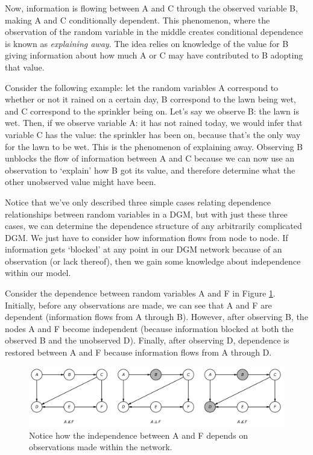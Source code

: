 Now, information is flowing between A and C through the observed variable B, making A and C conditionally dependent. This phenomenon, where the observation of the random variable in the middle creates conditional dependence is known as \textit{explaining away}. The idea relies on knowledge of the value for B giving information about how much A or C may have contributed to B adopting that value. 

Consider the following example: let the random variables A correspond to whether or not it rained on a certain day, B correspond to the lawn being wet, and C correspond to the sprinkler being on. Let's say we observe B: the lawn is wet. Then, if we observe variable A: it has not rained today, we would infer that variable C has the value: the sprinkler has been on, because that's the only way for the lawn to be wet. This is the phenomenon of explaining away. Observing B unblocks the flow of information between A and C because we can now use an observation to `explain' how B got its value, and therefore determine what the other unobserved value might have been.

Notice that we've only described three simple cases relating dependence relationships between random variables in a DGM, but with just these three cases, we can determine the dependence structure of any arbitrarily complicated DGM. We just have to consider how information flows from node to node. If information gets `blocked' at any point in our DGM network because of an observation (or lack thereof), then we gain some knowledge about independence within our model.

Consider the dependence between random variables A and F in Figure \ref{fig:information-flow-example}. Initially, before any observations are made, we can see that A and F are dependent (information flows from A through B). However, after observing B, the nodes A and F become independent (because information blocked at both the observed B and the unobserved D). Finally, after observing D, dependence is restored between A and F because information flows from A through D.
\begin{figure}
	\centering
	\includegraphics[width=0.75\paperwidth]{../GraphicalModels/fig/information-flow-example.png}
    \caption{Notice how the independence between A and F depends on observations made within the network.}
	\label{fig:information-flow-example}
\end{figure}

